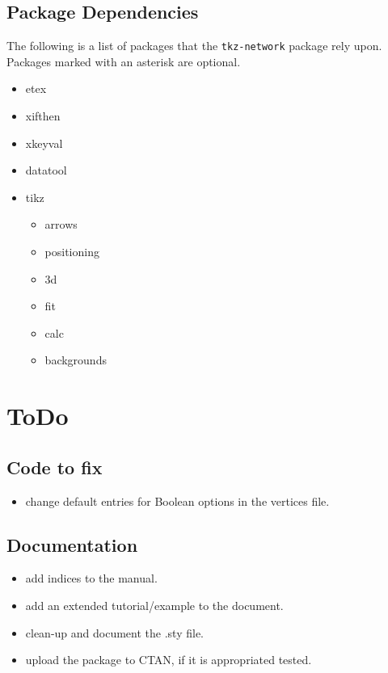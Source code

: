 \documentclass[a4paper,twosided,notoc]{tufte-book}
\newcommand{\doccls}[1]{\texttt{#1}}%
\newcommand{\pkg}{\doccls{tkz-network}\xspace}
\begin{document}
\section{Package Dependencies}\label{sec:dependencies}
The following is a list of packages that the \pkg package rely upon.  Packages marked with an asterisk are optional.
\begin{multicols}{2}
  \begin{itemize}
  \item etex
  \item xifthen
  \item xkeyval
  \item datatool
  \item tikz
    \begin{itemize}
    \item arrows
    \item positioning
    \item 3d
    \item fit
    \item calc
    \item backgrounds
    \end{itemize}
  \end{itemize}
\end{multicols}

\appendix
\chapter{ToDo}
\label{chap:todo}

\section{Code to fix}
\begin{itemize}
\item change default entries for Boolean options in the vertices file.
\end{itemize}

\section{Documentation}
\begin{itemize}
\item add indices to the manual.
\item add an extended tutorial/example to the document.
\item clean-up and document the .sty file.
\item upload the package to CTAN, if it is appropriated tested.
\end{itemize}
\end{document}
